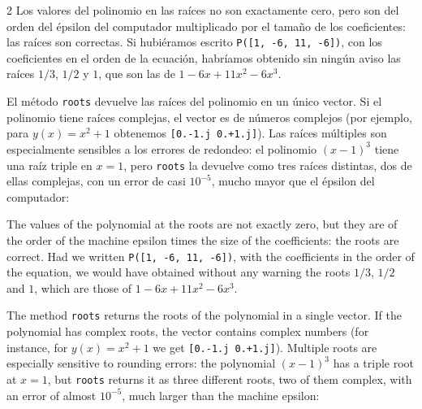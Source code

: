 \begin{paracol}{2}
Los valores del polinomio en las raíces no son exactamente cero, pero son del orden del épsilon del computador multiplicado por el tamaño de los coeficientes: las raíces son correctas. Si hubiéramos escrito \texttt{P([1, -6, 11, -6])}, con los coeficientes en el orden de la ecuación, habríamos obtenido sin ningún aviso las raíces $1/3$, $1/2$ y $1$, que son las de $1-6x+11x^2-6x^3$.

El método \texttt{roots} devuelve las raíces del polinomio en un único vector. Si el polinomio tiene raíces complejas, el vector es de números complejos (por ejemplo, para $y(x)=x^2+1$ obtenemos \texttt{[0.-1.j 0.+1.j]}). Las raíces múltiples son especialmente sensibles a los errores de redondeo: el polinomio $(x-1)^3$ tiene una raíz triple en $x=1$, pero \texttt{roots} la devuelve como tres raíces distintas, dos de ellas complejas, con un error de casi $10^{-5}$, mucho mayor que el épsilon del computador:

\switchcolumn
The values of the polynomial at the roots are not exactly zero, but they are of the order of the machine epsilon times the size of the coefficients: the roots are correct. Had we written \texttt{P([1, -6, 11, -6])}, with the coefficients in the order of the equation, we would have obtained without any warning the roots $1/3$, $1/2$ and $1$, which are those of $1-6x+11x^2-6x^3$.

The method \texttt{roots} returns the roots of the polynomial in a single vector. If the polynomial has complex roots, the vector contains complex numbers (for instance, for $y(x)=x^2+1$ we get \texttt{[0.-1.j 0.+1.j]}). Multiple roots are especially sensitive to rounding errors: the polynomial $(x-1)^3$ has a triple root at $x=1$, but \texttt{roots} returns it as three different roots, two of them complex, with an error of almost $10^{-5}$, much larger than the machine epsilon:
\end{paracol}

